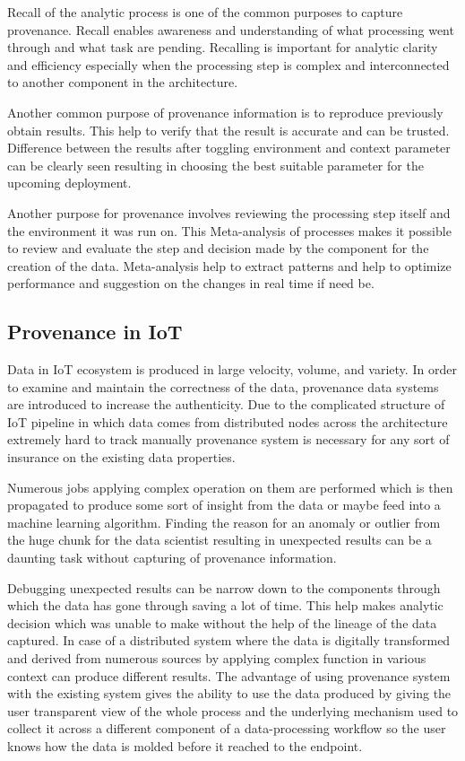 Recall of the analytic process is one of the common purposes to capture provenance. Recall enables awareness and understanding of what processing went through and what task are pending. Recalling is important for analytic clarity and efficiency especially when the processing step is complex and interconnected to another component in the architecture. 

Another common purpose of provenance information is to reproduce previously obtain results. This help to verify that the result is accurate and can be trusted. Difference between the results after toggling environment and context parameter can be clearly seen resulting in choosing the best suitable parameter for the upcoming deployment.

Another purpose for provenance involves reviewing the processing step itself and the environment it was run on. This Meta-analysis of processes makes it possible to review and evaluate the step and decision made by the component for the creation of the data. Meta-analysis help to extract patterns and help to optimize performance and suggestion on the changes in real time if need be.

\subsection{Provenance in IoT}
Data in IoT ecosystem is produced in large velocity, volume, and variety. In order to examine and maintain the correctness of the data, provenance data systems are introduced to increase the authenticity. Due to the complicated structure of IoT pipeline in which data comes from distributed nodes across the architecture extremely hard to track manually provenance system is necessary for any sort of insurance on the existing data properties.

Numerous jobs applying complex operation on them are performed which is then propagated to produce some sort of insight from the data or maybe feed into a machine learning algorithm. Finding the reason for an anomaly or outlier from the huge chunk for the data scientist resulting in unexpected results can be a daunting task without capturing of provenance information. 

Debugging unexpected results can be narrow down to the components through which the data has gone through saving a lot of time. This help makes analytic decision which was unable to make without the help of the lineage of the data captured. In case of a distributed system where the data is digitally transformed and derived from numerous sources by applying complex function in various context can produce different results. The advantage of using provenance system with the existing system gives the ability to use the data produced by giving the user transparent view of the whole process and the underlying mechanism used to collect it across a different component of a data-processing workflow so the user knows how the data is molded before it reached to the endpoint.

